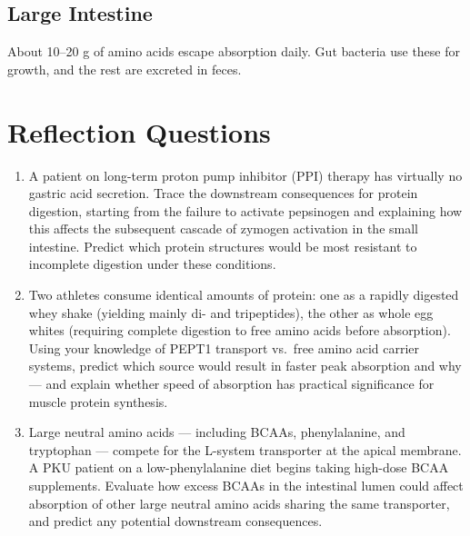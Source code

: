 \documentclass{tufte-handout}
\begin{document}
\subsection{Large Intestine}
About 10–20 g of amino acids escape absorption daily. Gut bacteria use these for growth, and the rest are excreted in feces.


\section{Reflection Questions}
\begin{enumerate}
\item A patient on long-term proton pump inhibitor (PPI) therapy has virtually no gastric acid secretion. Trace the downstream consequences for protein digestion, starting from the failure to activate pepsinogen and explaining how this affects the subsequent cascade of zymogen activation in the small intestine. Predict which protein structures would be most resistant to incomplete digestion under these conditions.
\item Two athletes consume identical amounts of protein: one as a rapidly digested whey shake (yielding mainly di- and tripeptides), the other as whole egg whites (requiring complete digestion to free amino acids before absorption). Using your knowledge of PEPT1 transport vs.\ free amino acid carrier systems, predict which source would result in faster peak absorption and why --- and explain whether speed of absorption has practical significance for muscle protein synthesis.
\item Large neutral amino acids --- including BCAAs, phenylalanine, and tryptophan --- compete for the L-system transporter at the apical membrane. A PKU patient on a low-phenylalanine diet begins taking high-dose BCAA supplements. Evaluate how excess BCAAs in the intestinal lumen could affect absorption of other large neutral amino acids sharing the same transporter, and predict any potential downstream consequences.
\end{enumerate}



\end{document}
